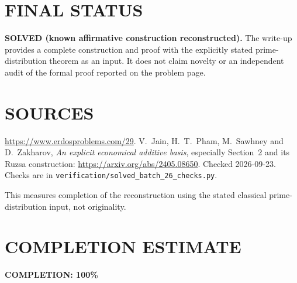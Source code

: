 \section{FINAL STATUS}
\textbf{SOLVED (known affirmative construction reconstructed).}
The write-up provides a complete construction and proof with the
explicitly stated prime-distribution theorem as an input. It does not
claim novelty or an independent audit of the formal proof reported on
the problem page.

\section{SOURCES}
\url{https://www.erdosproblems.com/29}.
V.~Jain, H.~T.~Pham, M.~Sawhney and D.~Zakharov,
\emph{An explicit economical additive basis}, especially Section~2
and its Ruzsa construction:
\url{https://arxiv.org/abs/2405.08650}.
Checked 2026-09-23. Checks are in
\texttt{verification/solved\_batch\_26\_checks.py}.

This measures completion of the reconstruction using the stated
classical prime-distribution input, not originality.

\section{COMPLETION ESTIMATE}
\textbf{COMPLETION: 100\%}
